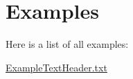 \section{Examples}
Here is a list of all examples\-:\begin{DoxyCompactItemize}
\item 
\hyperlink{_example_text_header_8txt-example}{Example\-Text\-Header.\-txt}
\end{DoxyCompactItemize}
